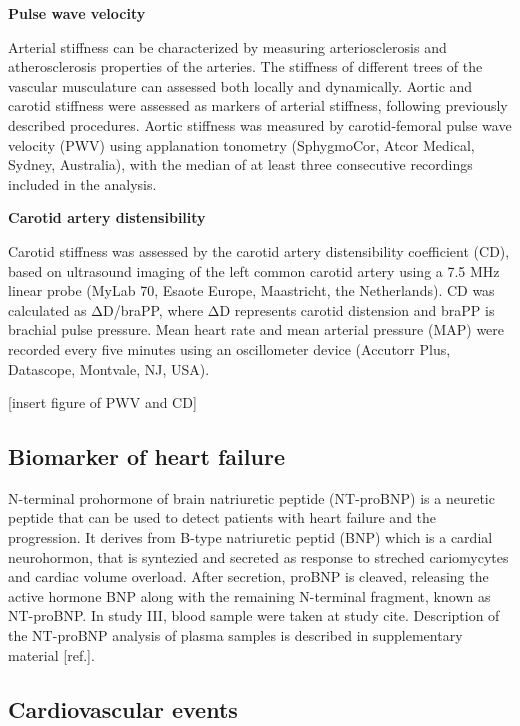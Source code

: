 \documentclass[
  a4paper,
  headsepline=true,
  open=any]{scrbook}
\begin{document}
\textbf{Pulse wave velocity}

Arterial stiffness can be characterized by measuring arteriosclerosis
and atherosclerosis properties of the arteries. The stiffness of
different trees of the vascular musculature can assessed both locally
and dynamically. Aortic and carotid stiffness were assessed as markers
of arterial stiffness, following previously described procedures. Aortic
stiffness was measured by carotid-femoral pulse wave velocity (PWV)
using applanation tonometry (SphygmoCor, Atcor Medical, Sydney,
Australia), with the median of at least three consecutive recordings
included in the analysis.

\textbf{Carotid artery distensibility}

Carotid stiffness was assessed by the carotid artery distensibility
coefficient (CD), based on ultrasound imaging of the left common carotid
artery using a 7.5 MHz linear probe (MyLab 70, Esaote Europe,
Maastricht, the Netherlands). CD was calculated as ΔD/braPP, where ΔD
represents carotid distension and braPP is brachial pulse pressure. Mean
heart rate and mean arterial pressure (MAP) were recorded every five
minutes using an oscillometer device (Accutorr Plus, Datascope,
Montvale, NJ, USA).

{[}insert figure of PWV and CD{]}

\hypertarget{biomarker-of-heart-failure}{%
\subsection{Biomarker of heart
failure}\label{biomarker-of-heart-failure}}

N-terminal prohormone of brain natriuretic peptide (NT-proBNP) is a
neuretic peptide that can be used to detect patients with heart failure
and the progression. It derives from B-type natriuretic peptid (BNP)
which is a cardial neurohormon, that is syntezied and secreted as
response to streched cariomycytes and cardiac volume overload. After
secretion, proBNP is cleaved, releasing the active hormone BNP along
with the remaining N-terminal fragment, known as NT-proBNP. In study
III, blood sample were taken at study cite. Description of the NT-proBNP
analysis of plasma samples is described in supplementary material
{[}ref.{]}.

\hypertarget{cardiovascular-events}{%
\subsection{Cardiovascular events}\label{cardiovascular-events}}
\end{document}
